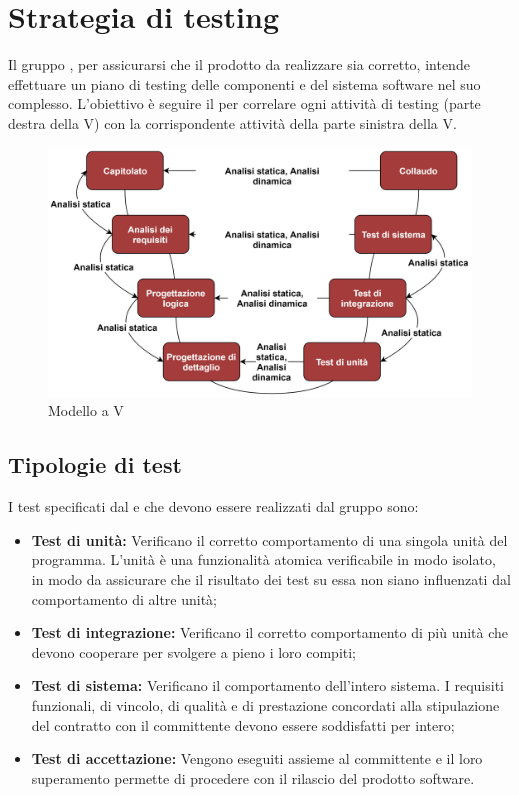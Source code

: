 \section{Strategia di testing}
Il gruppo \Gruppo{}, per assicurarsi che il prodotto da realizzare sia corretto, intende effettuare un piano di testing delle componenti e del sistema software nel suo complesso.
L'obiettivo è seguire il  per correlare ogni attività di testing (parte destra della V) con la corrispondente attività della parte sinistra della V.

\begin{figure}[h]
    \centering
    \includegraphics[scale=0.85]{Sezioni/Immagini/ModelloV.png}
    \caption{Modello a V}
\end{figure}

\subsection{Tipologie di test}
I test specificati dal  e che devono essere realizzati dal gruppo sono:
\begin{itemize}
    \item \textbf{Test di unità:} Verificano il corretto comportamento di una singola unità del programma. L'unità è una funzionalità atomica verificabile in modo isolato, in modo da assicurare che il risultato dei test su essa non siano influenzati dal comportamento di altre unità; 
    \item \textbf{Test di integrazione:} Verificano il corretto comportamento di più unità che devono cooperare per svolgere a pieno i loro compiti;
    \item \textbf{Test di sistema:} Verificano il comportamento dell'intero sistema. I requisiti funzionali, di vincolo, di qualità e di prestazione concordati alla stipulazione del contratto con il committente devono essere soddisfatti per intero;
    \item \textbf{Test di accettazione:} Vengono eseguiti assieme al committente e il loro superamento permette di procedere con il rilascio del prodotto software.
\end{itemize}

